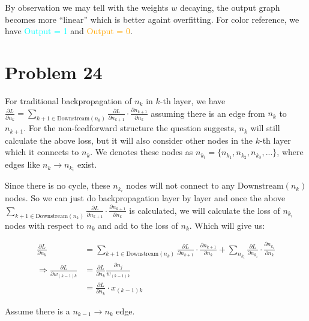 \documentclass[12pt]{article}
\newcommand{\p}{\partial}
\begin{document}
By observation we may tell with the weights $w$ decaying, the output graph becomes more ``linear'' which is better againt overfitting. For color reference, we have \textcolor{cyan}{Output = 1} and \textcolor{orange}{Output = 0}.

\section{Problem 24}


For traditional backpropagation of $n_k$ in $k$-th layer, we have $\frac{\p L}{\p n_k}  = \sum\limits_{k+1 \in \text{Downstream}(n_k)} \frac{\p L}{\p n_{k+1}} \cdot \frac{\p n_{k+1}}{\p n_k}$ assuming there is an edge from $n_k$ to $n_{k+1}$. For the non-feedforward structure the question suggests, $n_k$ will still calculate the above loss, but it will also consider other nodes in the $k$-th layer which it connects to $n_k$. We denotes these nodes as $n_{k_i} = \{n_{k_1}, n_{k_2}, n_{k_3}, ...\}$, where edges like $n_k \to n_{k_i}$ exist. \newline

Since there is no cycle, these $n_{k_i}$ nodes will not connect to any $\text{Downstream}(n_k)$ nodes. So we can just do backpropagation layer by layer and once the above $\sum\limits_{k+1 \in \text{Downstream}(n_k)} \frac{\p L}{\p n_{k+1}} \cdot \frac{\p n_{k+1}}{\p n_k}$ is calculated, we will calculate the loss of $n_{k_i}$ nodes with respect to $n_k$ and add to the loss of $n_k$. Which will give us:

\begin{align*}
    \frac{\p L}{\p n_k}  &= \sum\limits_{k+1 \in \text{Downstream}(n_k)} \frac{\p L}{\p n_{k+1}} \cdot \frac{\p n_{k+1}}{\p n_k} + \sum\limits_{n_{k_i}} \frac{\p L}{\p n_{k_i}} \cdot \frac{\p n_{k_i}}{\p n_k} \\
    \Longrightarrow \frac{\p L}{\p w_{(k-1)k}} &= \frac{\p L}{\p n_k} \frac{\p n_j}{w_{(k-1)k}} \\
    &= \frac{\p L}{\p n_k} \cdot x_{(k-1)k}
\end{align*}

Assume there is a $n_{k-1} \to n_k$ edge.

\end{document}
